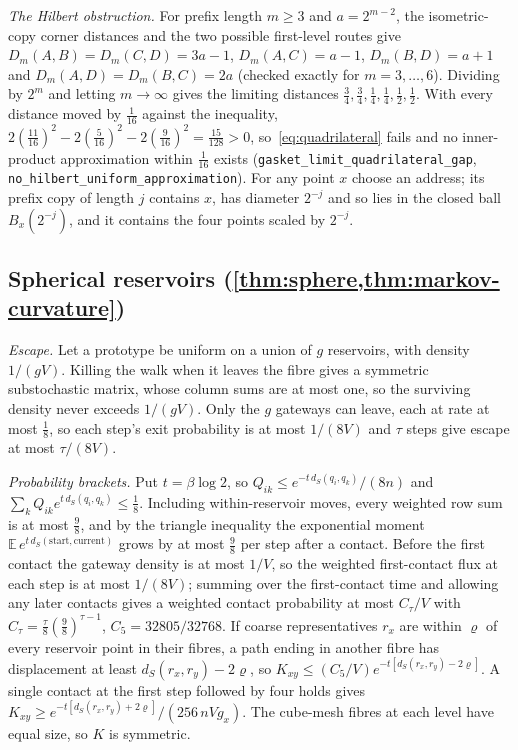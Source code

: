 \documentclass[11pt]{article}
\newcommand{\lean}[1]{\nolinkurl{#1}}
\begin{document}
\emph{The Hilbert obstruction.}
For prefix length $m\ge3$ and $a=2^{m-2}$, the isometric-copy corner distances and the two possible first-level routes give
$D_m(A,B)=D_m(C,D)=3a-1$, $D_m(A,C)=a-1$, $D_m(B,D)=a+1$ and $D_m(A,D)=D_m(B,C)=2a$ (checked exactly for $m=3,\dots,6$).
Dividing by $2^m$ and letting $m\to\infty$ gives the limiting distances $\tfrac34,\tfrac34,\tfrac14,\tfrac14,\tfrac12,\tfrac12$.
With every distance moved by $\tfrac1{16}$ against the inequality, $2(\tfrac{11}{16})^2-2(\tfrac5{16})^2-2(\tfrac9{16})^2=\tfrac{15}{128}>0$, so~\eqref{eq:quadrilateral} fails and no inner-product approximation within $\tfrac1{16}$ exists (\lean{gasket_limit_quadrilateral_gap}, \lean{no_hilbert_uniform_approximation}).
For any point $x$ choose an address; its prefix copy of length $j$ contains $x$, has diameter $2^{-j}$ and so lies in the closed ball $B_x(2^{-j})$, and it contains the four points scaled by $2^{-j}$.

\subsection{Spherical reservoirs (\texorpdfstring{\cref{thm:sphere,thm:markov-curvature}}{Theorems 6.4 and 7.4})}
\label{app:sphere-proof}

\emph{Escape.}
Let a prototype be uniform on a union of $g$ reservoirs, with density $1/(gV)$.
Killing the walk when it leaves the fibre gives a symmetric substochastic matrix, whose column sums are at most one, so the surviving density never exceeds $1/(gV)$.
Only the $g$ gateways can leave, each at rate at most $\tfrac18$, so each step's exit probability is at most $1/(8V)$ and $\tau$ steps give escape at most $\tau/(8V)$.

\emph{Probability brackets.}
Put $t=\beta\log2$, so $Q_{ik}\le e^{-t\,d_S(q_i,q_k)}/(8n)$ and $\sum_kQ_{ik}e^{t\,d_S(q_i,q_k)}\le\tfrac18$.
Including within-reservoir moves, every weighted row sum is at most $\tfrac98$, and by the triangle inequality the exponential moment $\mathbb E\,e^{t\,d_S(\text{start},\text{current})}$ grows by at most $\tfrac98$ per step after a contact.
Before the first contact the gateway density is at most $1/V$, so the weighted first-contact flux at each step is at most $1/(8V)$; summing over the first-contact time and allowing any later contacts gives a weighted contact probability at most $C_\tau/V$ with $C_\tau=\tfrac\tau8(\tfrac98)^{\tau-1}$, $C_5=32805/32768$.
If coarse representatives $r_x$ are within $\varrho$ of every reservoir point in their fibres, a path ending in another fibre has displacement at least $d_S(r_x,r_y)-2\varrho$, so $K_{xy}\le(C_5/V)e^{-t[d_S(r_x,r_y)-2\varrho]}$.
A single contact at the first step followed by four holds gives $K_{xy}\ge e^{-t[d_S(r_x,r_y)+2\varrho]}/(256\,nVg_x)$.
The cube-mesh fibres at each level have equal size, so $K$ is symmetric.
\end{document}
